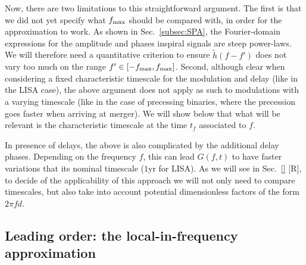 \documentclass[aps,showpacs,twocolumn,
prd,superscriptaddress,nofootinbib]{revtex4-1}
\newcommand{\SM}[1]{{\color{Red} #1}}
\begin{document}
Now, there are two limitations to this straightforward argument. The first is that we did not yet specify what $f_{\rm max}$ should be compared with, in order for the approximation to work. As shown in Sec.~\ref{subsec:SPA}, the Fourier-domain expressions for the amplitude and phases inspiral signals are steep power-laws. We will therefore need a quantitative criterion to ensure $\tilde{h}(f-f')$ does not vary too much on the range $f'\in [-f_{\rm max}, f_{\rm max}]$. Second, although clear when considering a fixed characteristic timescale for the modulation and delay (like in the LISA case), the above argument does not apply as such to modulations with a varying timescale (like in the case of precessing binaries, where the precession goes faster when arriving at merger). We will show below that what will be relevant is the characteristic timescale at the time $t_{f}$ associated to $f$. 

In presence of delays, the above is also complicated by the additional delay phases. Depending on the frequency $f$, this can lead $G(f,t)$ to have faster variations that its nominal timescale ($1\mathrm{yr}$ for LISA). As we will see in Sec.~\ref{} \SM{[R]}, to decide of the applicability of this approach we will not only need to compare timescales, but also take into account potential dimensionless factors of the form $2\pi f d$.


\subsection{Leading order: the local-in-frequency approximation}
\label{subsec:LLP}
\end{document}
